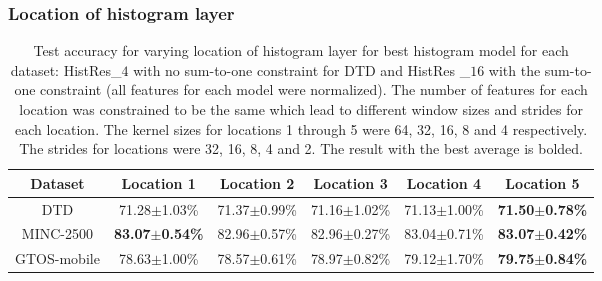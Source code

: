 \documentclass[journal]{IEEEtai}
\begin{document}
	\subsubsection{Location of histogram layer} 
	\begin{table*}[htb]
\caption{Test accuracy for varying location of histogram layer for best histogram model for each dataset: HistRes\_$4$ with no sum-to-one constraint for DTD and HistRes \_$16$ with the sum-to-one constraint (all features for each model were normalized). The number of features for each location was constrained to be the same which lead to different window sizes and strides for each location. The kernel sizes for locations 1 through 5 were 64, 32, 16, 8 and 4 respectively. The strides for locations were 32, 16, 8, 4 and 2. The result with the best average is bolded.}
		\centering
		\begin{tabular}{|c|c|c|c|c|c|}
			\hline
			Dataset      & Location 1             & Location 2    & Location 3    & Location 4    & Location 5             \\ \hline
			DTD              & 71.28$\pm$1.03\%          & 71.37$\pm$0.99\% & 71.16$\pm$1.02\% & 71.13$\pm$1.00\% & \textbf{71.50$\pm$0.78\%} \\ \hline
			MINC-2500 & \textbf{83.07$\pm$0.54\%} & 82.96$\pm$0.57\% & 82.96$\pm$0.27\% & 83.04$\pm$0.71\% & \textbf{83.07$\pm$0.42\%} \\ \hline
			GTOS-mobile  & 78.63$\pm$1.00\%          & 78.57$\pm$0.61\% & 78.97$\pm$0.82\% & 79.12$\pm$1.70\% & \textbf{79.75$\pm$0.84\%} \\ \hline
		\end{tabular}
		\label{tab:Scale}
\end{table*}
	
\end{document}
